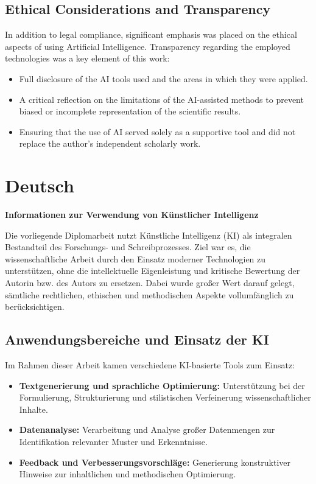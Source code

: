 \subsection*{Ethical Considerations and Transparency}
In addition to legal compliance, significant emphasis was placed on the ethical aspects of using Artificial Intelligence. Transparency regarding the employed technologies was a key element of this work:
\begin{itemize}
    \item Full disclosure of the AI tools used and the areas in which they were applied.
    \item A critical reflection on the limitations of the AI-assisted methods to prevent biased or incomplete representation of the scientific results.
    \item Ensuring that the use of AI served solely as a supportive tool and did not replace the author’s independent scholarly work.
\end{itemize}


\section*{Deutsch}
\textbf{Informationen zur Verwendung von Künstlicher Intelligenz}

Die vorliegende Diplomarbeit nutzt Künstliche Intelligenz (KI) als integralen Bestandteil des Forschungs- und Schreibprozesses. Ziel war es, die wissenschaftliche Arbeit durch den Einsatz moderner Technologien zu unterstützen, ohne die intellektuelle Eigenleistung und kritische Bewertung der Autorin bzw. des Autors zu ersetzen. Dabei wurde großer Wert darauf gelegt, sämtliche rechtlichen, ethischen und methodischen Aspekte vollumfänglich zu berücksichtigen.

\subsection*{Anwendungsbereiche und Einsatz der KI}
Im Rahmen dieser Arbeit kamen verschiedene KI-basierte Tools zum Einsatz:
\begin{itemize}
    \item \textbf{Textgenerierung und sprachliche Optimierung:} Unterstützung bei der Formulierung, Strukturierung und stilistischen Verfeinerung wissenschaftlicher Inhalte. 
    \item \textbf{Datenanalyse:} Verarbeitung und Analyse großer Datenmengen zur Identifikation relevanter Muster und Erkenntnisse.
    \item \textbf{Feedback und Verbesserungsvorschläge:} Generierung konstruktiver Hinweise zur inhaltlichen und methodischen Optimierung.
\end{itemize}

